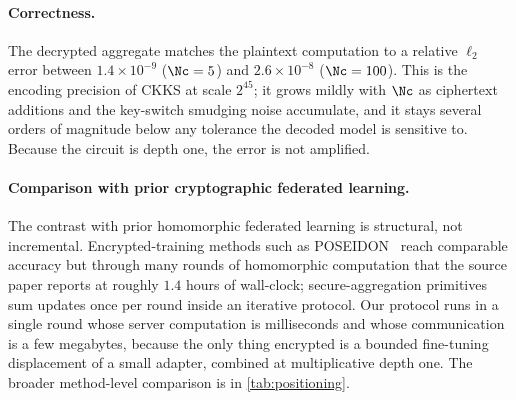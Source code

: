 \paragraph{Correctness.} The decrypted aggregate matches the plaintext computation to a relative $\ell_2$
error between $1.4\times10^{-9}$ ($\Nc=5$) and $2.6\times10^{-8}$ ($\Nc=100$). This is the encoding precision
of CKKS at scale $2^{45}$; it grows mildly with $\Nc$ as ciphertext additions and the key-switch smudging
noise accumulate, and it stays several orders of magnitude below any tolerance the decoded model is sensitive
to. Because the circuit is depth one, the error is not amplified.

\paragraph{Comparison with prior cryptographic federated learning.} The contrast with prior homomorphic
federated learning is structural, not incremental. Encrypted-training methods such as
POSEIDON~\cite{sav2021poseidon} reach comparable accuracy but through many rounds of homomorphic computation
that the source paper reports at roughly $1.4$ hours of wall-clock; secure-aggregation
primitives~\cite{kemmaka2025hybagg} sum updates once per round inside an iterative protocol. Our protocol runs
in a single round whose server computation is milliseconds and whose communication is a few megabytes,
because the only thing encrypted is a bounded fine-tuning displacement of a small adapter, combined at
multiplicative depth one. The broader method-level comparison is in \cref{tab:positioning}.
